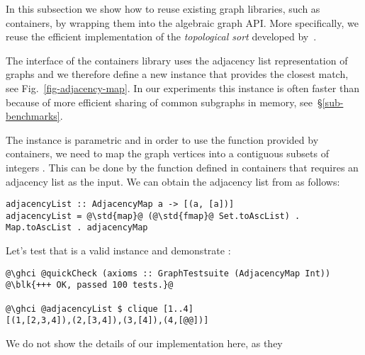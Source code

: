 In this subsection we show how to reuse existing graph libraries, such as
\textsf{containers}, by wrapping them into the algebraic graph API. More specifically,
we reuse the efficient implementation of the \emph{topological sort} developed
by~\citet{1995_king_graphs}.

The interface of the \textsf{containers} library uses the adjacency list
representation of graphs and we therefore define a new  instance that
provides the closest match, see Fig.~\ref{fig-adjacency-map}. In our experiments
this instance is often faster than  because of more efficient
sharing of common subgraphs in memory, see~\S\ref{sub-benchmarks}.

The  instance is parametric and in order to use the
 function provided by \textsf{containers}, we need to map the graph vertices
into a contiguous subsets of integers . This can be done by the function
 defined in \textsf{containers} that requires an adjacency list as
the input. We can obtain the adjacency list from  as follows:

\begin{verbatim}
adjacencyList :: AdjacencyMap a -> [(a, [a])]
adjacencyList = @\std{map}@ (@\std{fmap}@ Set.toAscList) . Map.toAscList . adjacencyMap
\end{verbatim}

\noindent
Let's test that  is a valid  instance and
demonstrate :

\begin{verbatim}
@\ghci @quickCheck (axioms :: GraphTestsuite (AdjacencyMap Int))
@\blk{+++ OK, passed 100 tests.}@

@\ghci @adjacencyList $ clique [1..4]
[(1,[2,3,4]),(2,[3,4]),(3,[4]),(4,[@@])]
\end{verbatim}


We do not show the details of our
implementation here, as they
